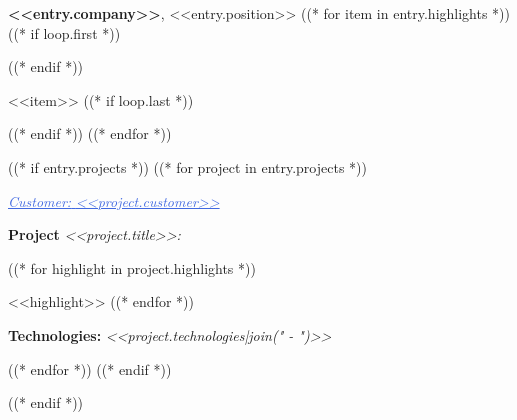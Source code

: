 \begin{onecolentry}
    \faBriefcase\hspace{4pt}\textbf{<<entry.company>>}, <<entry.position>>
    ((* for item in entry.highlights *))
        ((* if loop.first *))
    \begin{highlights}
        ((* endif *))
        \item <<item>>
        ((* if loop.last *))
    \end{highlights}
        ((* endif *))
    ((* endfor *))

    ((* if entry.projects *))
    \vspace{<<design.margins.projects_area.vertical_between_projects>>}
    ((* for project in entry.projects *))
        \vspace{<<design.margins.projects_area.vertical_between_projects>>}

        \textcolor{RoyalBlue}{\faAngleDoubleRight\hspace{0.1cm}\underline{\textit{Customer:} \textit{<<project.customer>>}}}

        \vspace{0.2cm}
        \textbf{Project \faAngleRight} \textit{<<project.title>>:}

        \begin{highlights}
            ((* for highlight in project.highlights *))
                \item <<highlight>>
            ((* endfor *))
        \end{highlights}
        \faBuffer
        \textbf{ Technologies:} \textit{<<project.technologies|join(" - ")>>}
        \vspace{<<design.margins.projects_area.vertical_between_projects>>}

    ((* endfor *))
    ((* endif *))
\end{onecolentry}
((* endif *))